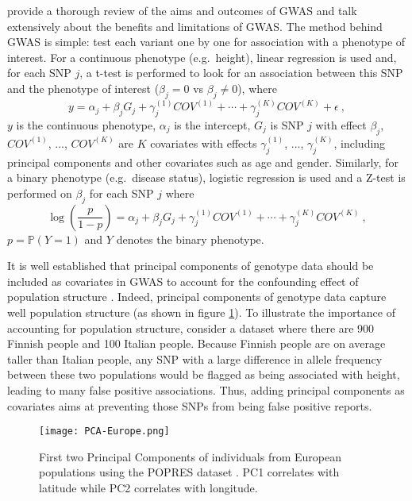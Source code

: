 \cite{visscher201710} provide a thorough review of the aims and outcomes of GWAS and \cite{tam2019benefits} talk extensively about the benefits and limitations of GWAS.
The method behind GWAS is simple: test each variant one by one for association with a phenotype of interest.
For a continuous phenotype (e.g.\ height), linear regression is used and, for each SNP $j$, a t-test is performed to look for an association between this SNP and the phenotype of interest ($\beta_j = 0$ vs $\beta_j \neq 0$), where
\begin{equation}
y = \alpha_j + \beta_j G_{j} + \gamma_j^{(1)} COV^{(1)} + \cdots + \gamma_j^{(K)} COV^{(K)} + \epsilon~,\label{eq:gwas1}
\end{equation}
$y$ is the continuous phenotype, $\alpha_j$ is the intercept, $G_{j}$ is SNP $j$ with effect $\beta_j$, $COV^{(1)}$, ..., $COV^{(K)}$ are $K$ covariates with effects $\gamma_j^{(1)}$, ..., $\gamma_j^{(K)}$, including principal components and other covariates such as age and gender. Similarly, for a binary phenotype (e.g.\ disease status), logistic regression is used and a Z-test is performed on $\beta_j$ for each SNP $j$ where
\begin{equation}
\log{\left(\frac{p}{1-p}\right)} = \alpha_j + \beta_j G_{j} + \gamma_j^{(1)} COV^{(1)} + \cdots + \gamma_j^{(K)} COV^{(K)}~,\label{eq:gwas2}
\end{equation}
$p = \mathbb{P}(Y = 1)$ and $Y$ denotes the binary phenotype.

It is well established that principal components of genotype data should be included as covariates in GWAS to account for the confounding effect of population structure \cite[]{price2006principal}. Indeed, principal components of genotype data capture well population structure (as shown in figure \ref{fig:pca}). 
To illustrate the importance of accounting for population structure, consider a dataset where there are 900 Finnish people and 100 Italian people. Because Finnish people are on average taller than Italian people, any SNP with a large difference in allele frequency between these two populations would be flagged as being associated with height, leading to many false positive associations. Thus, adding principal components as covariates aims at preventing those SNPs from being false positive reports.

\begin{figure}[htb]
\centerline{\texttt{[image: PCA-Europe.png]}}
\caption{First two Principal Components of individuals from European populations using the POPRES dataset \cite[]{nelson2008population}. PC1 correlates with latitude while PC2 correlates with longitude.}\label{fig:pca}
\end{figure}

